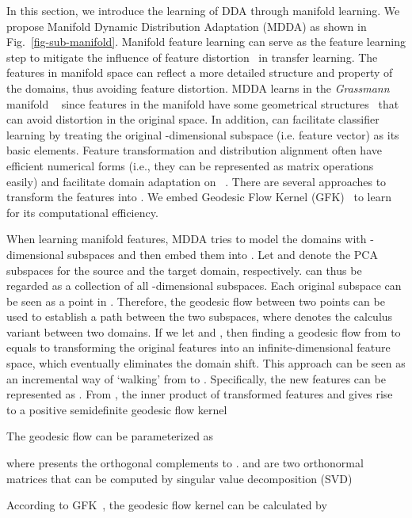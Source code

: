 \documentclass[acmsmall]{acmart}
\begin{document}
In this section, we introduce the learning of DDA through manifold learning. We propose Manifold Dynamic Distribution Adaptation (MDDA) as shown in Fig.~\ref{fig-sub-manifold}. Manifold feature learning can serve as the feature learning step to mitigate the influence of feature distortion~\cite{baktashmotlagh2013unsupervised} in transfer learning. The features in manifold space can reflect a more detailed structure and property of the domains, thus avoiding feature distortion. MDDA learns  in the \textit{Grassmann} manifold ~\cite{hamm2008grassmann} since features in the manifold have some geometrical structures~\cite{belkin2006manifold,hamm2008grassmann} that can avoid distortion in the original space. In addition,  can facilitate classifier learning by treating the original -dimensional subspace (i.e. feature vector) as its basic elements. Feature transformation and distribution alignment often have efficient numerical forms (i.e., they can be represented as matrix operations easily) and facilitate domain adaptation on ~\cite{hamm2008grassmann}. There are several approaches to transform the features into  \cite{gopalan2011domain,baktashmotlagh2014domain}. We embed Geodesic Flow Kernel (GFK)~\cite{gong2012geodesic} to learn  for its computational efficiency.

When learning manifold features, MDDA tries to model the domains with -dimensional subspaces and then embed them into . Let  and  denote the PCA subspaces for the source and the target domain, respectively.  can thus be regarded as a collection of all -dimensional subspaces. Each original subspace can be seen as a point in . Therefore, the geodesic flow  between two points can be used to establish a path between the two subspaces, where  denotes the calculus variant between two domains. If we let  and , then finding a geodesic flow from  to  equals to transforming the original features into an infinite-dimensional feature space, which eventually eliminates the domain shift. This approach can be seen as an incremental way of `walking' from  to . Specifically, the new features can be represented as . From \cite{gong2012geodesic}, the inner product of transformed features  and  gives rise to a positive semidefinite geodesic flow kernel


The geodesic flow can be parameterized as

where  presents the orthogonal complements to .  and  are two orthonormal matrices that can be computed by singular value decomposition (SVD)


According to GFK~\cite{gong2012geodesic}, the geodesic flow kernel  can be calculated by
\end{document}
